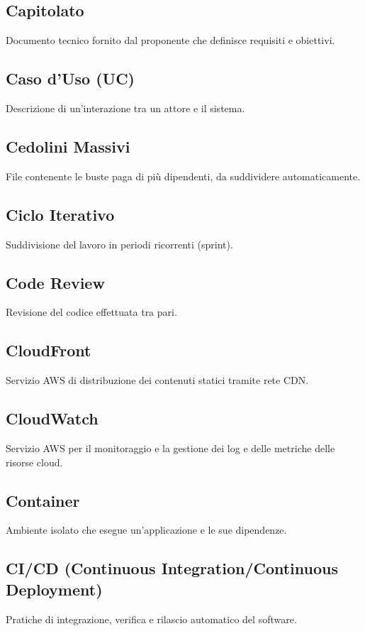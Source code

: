 \documentclass[a4paper,12pt]{article}
\begin{document}
\subsection{Capitolato}
Documento tecnico fornito dal proponente che definisce requisiti e obiettivi.

\subsection{Caso d'Uso (UC)}
Descrizione di un'interazione tra un attore e il sistema.

\subsection{Cedolini Massivi}
File contenente le buste paga di più dipendenti, da suddividere automaticamente.

\subsection{Ciclo Iterativo}
Suddivisione del lavoro in periodi ricorrenti (sprint).

\subsection{Code Review}
Revisione del codice effettuata tra pari.

\subsection{CloudFront}
Servizio AWS di distribuzione dei contenuti statici tramite rete CDN.

\subsection{CloudWatch}
Servizio AWS per il monitoraggio e la gestione dei log e delle metriche delle risorse cloud.

\subsection{Container}
Ambiente isolato che esegue un'applicazione e le sue dipendenze.

\subsection{CI/CD (Continuous Integration/Continuous Deployment)}
Pratiche di integrazione, verifica e rilascio automatico del software.
\end{document}
